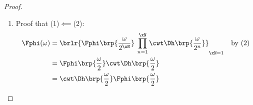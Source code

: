 \begin{proof}
\begin{enumerate}
\begin{enumerate}
      \item Proof that [$\xN$ case]$\implies$[$\xN+1$ case]:
        \begin{align*}
          \Fphi\brp{\frac{\omega}{2^{\xN+1}}}\:\prod_{n=1}^{\xN+1} \cwt \Dh\brp{\frac{\omega}{2^n}}
            &= \brs{\prod_{n=1}^{\xN} \cwt \Dh\brp{\frac{\omega}{2^n}}}
               \mcom{\cwt \Dh\brp{\frac{\omega}{2^{N+1}}}\Fphi\brp{\frac{\omega}{2^{\xN+1}}}}{$\Fphi(\omega/2^\xN)$}
          \\&= \Fphi(\omega/2^\xN) \prod_{n=1}^{\xN} \cwt \Dh\brp{\frac{\omega}{2^n}}
          \\&= \Fphi(\omega)
            && \text{by [$\xN$ case] hypothesis}
        \end{align*}
    \end{enumerate}

  \item Proof that (1)$\impliedby$(2):
    \begin{align*}
      \Fphi(\omega)
        &= \brlr{\Fphi\brp{\frac{\omega}{2^{\xN}}}\:\prod_{n=1}^{\xN} \cwt \Dh\brp{\frac{\omega}{2^n}}}_{\xN=1}
        && \text{by (2)}
      \\&= \Fphi\brp{\frac{\omega}{2}}\cwt \Dh\brp{\frac{\omega}{2}}
      \\&= \cwt\Dh\brp{\frac{\omega}{2}}\Fphi\brp{\frac{\omega}{2}} 
    \end{align*}

\end{enumerate}
\end{proof}

